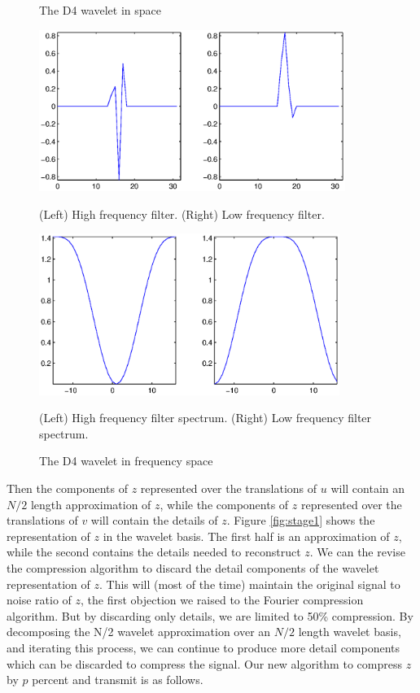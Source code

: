 \documentclass{report}
\begin{document}
\begin{figure}
\center
\caption{The D4 wavelet in space}
\label{fig:d4}
\includegraphics[height=5.25cm]{d4}

{(Left) High frequency filter. (Right) Low frequency filter.}

\caption{The D4 wavelet in frequency space}
\label{fig:Fd4}
\includegraphics[height=5.25cm]{d4Four}

{(Left) High frequency filter spectrum. (Right) Low frequency filter spectrum.}
\end{figure}

Then the components of $z$ represented over the translations of $u$ will contain an $N/2$ length approximation of $z$, while the components of $z$ represented over the translations of $v$ will contain the details of $z$. Figure \ref{fig:stage1} shows the  representation of $z$ in the wavelet basis. The first half is an approximation of $z$, while the second contains the details needed to reconstruct $z$. We can the revise the compression algorithm to discard the detail components of the wavelet representation of $z$. This will (most of the time) maintain the original signal to noise ratio of $z$, the first objection we raised to the Fourier compression algorithm. But by discarding only details, we are limited to 50\% compression. By decomposing the N/2 wavelet approximation over an $N/2$ length wavelet basis, and iterating this process, we can continue to produce more detail components which can be discarded to compress the signal. Our new algorithm to compress $z$ by $p$ percent and transmit is as follows.
\end{document}
